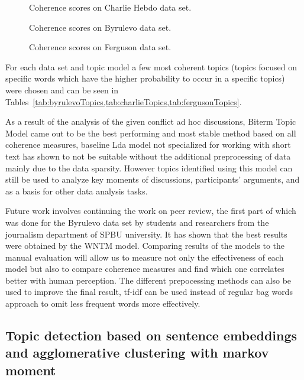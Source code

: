 \begin{figure}[ht]
	\caption{Coherence scores on Charlie Hebdo data set.}\label{fig:charlieCoherence}
\end{figure}

\begin{figure}[ht]
	\caption{Coherence scores on Byrulevo data set.}\label{fig:byrulevoCoherence}
\end{figure}

\begin{figure}[ht]
	\caption{Coherence scores on Ferguson data set.}\label{fig:fergusonCoherence}
\end{figure}

For each data set and topic model a few most coherent topics (topics focused on specific words which have the higher probability to occur in a specific topics) were chosen and can be seen in Tables~\cref{tab:byrulevoTopics,tab:charlieTopics,tab:fergusonTopics}.

As a result of the analysis of the given conflict ad hoc discussions, Biterm Topic Model came out to be the best performing and most stable method based on all coherence measures, baseline Lda model not specialized for working with short text has shown to not be suitable without the additional preprocessing of data mainly due to the data sparsity. However topics identified using this model can still be used to analyze key moments of discussions, participants’ arguments, and as a basis for other data analysis tasks.

Future work involves continuing the work on peer review, the first part of which was done for the Byrulevo data set by students and researchers from the journalism department of SPBU university. It has shown that the best results were obtained by the WNTM model. Comparing results of the models to the manual evaluation will allow us to measure not only the effectiveness of each model but also to compare coherence measures and find which one correlates better with human perception. The different prepocessing methods can also be used to improve the final result, tf-idf can be used instead of regular bag words approach to omit less frequent words more effectively.

\subsection{Topic detection based on sentence embeddings and agglomerative clustering with markov moment}\label{subsec:ch5/sec2/sub2}

